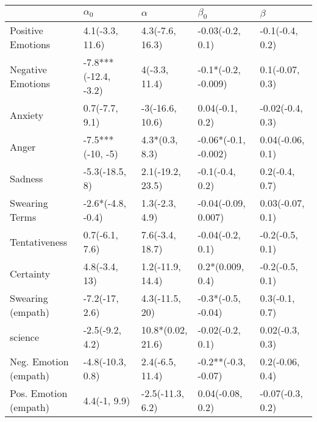 \begin{tabular}{lllll}
\toprule
{} &            $\alpha_0$ &           $\alpha$ &             $\beta_0$ &           $\beta$ \\
\midrule
Positive Emotions     &       4.1(-3.3, 11.6) &    4.3(-7.6, 16.3) &      -0.03(-0.2, 0.1) &   -0.1(-0.4, 0.2) \\
Negative Emotions     &  -7.8***(-12.4, -3.2) &      4(-3.3, 11.4) &   -0.1*(-0.2, -0.009) &   0.1(-0.07, 0.3) \\
Anxiety               &        0.7(-7.7, 9.1) &    -3(-16.6, 10.6) &       0.04(-0.1, 0.2) &  -0.02(-0.4, 0.3) \\
Anger                 &      -7.5***(-10, -5) &     4.3*(0.3, 8.3) &  -0.06*(-0.1, -0.002) &  0.04(-0.06, 0.1) \\
Sadness               &        -5.3(-18.5, 8) &   2.1(-19.2, 23.5) &       -0.1(-0.4, 0.2) &    0.2(-0.4, 0.7) \\
Swearing Terms        &     -2.6*(-4.8, -0.4) &     1.3(-2.3, 4.9) &   -0.04(-0.09, 0.007) &  0.03(-0.07, 0.1) \\
Tentativeness         &        0.7(-6.1, 7.6) &    7.6(-3.4, 18.7) &      -0.04(-0.2, 0.1) &   -0.2(-0.5, 0.1) \\
Certainty             &         4.8(-3.4, 13) &   1.2(-11.9, 14.4) &      0.2*(0.009, 0.4) &   -0.2(-0.5, 0.1) \\
Swearing (empath)     &        -7.2(-17, 2.6) &     4.3(-11.5, 20) &    -0.3*(-0.5, -0.04) &    0.3(-0.1, 0.7) \\
science               &       -2.5(-9.2, 4.2) &  10.8*(0.02, 21.6) &      -0.02(-0.2, 0.1) &   0.02(-0.3, 0.3) \\
Neg. Emotion (empath) &      -4.8(-10.3, 0.8) &    2.4(-6.5, 11.4) &   -0.2**(-0.3, -0.07) &   0.2(-0.06, 0.4) \\
Pos. Emotion (empath) &          4.4(-1, 9.9) &   -2.5(-11.3, 6.2) &      0.04(-0.08, 0.2) &  -0.07(-0.3, 0.2) \\
\bottomrule
\end{tabular}
